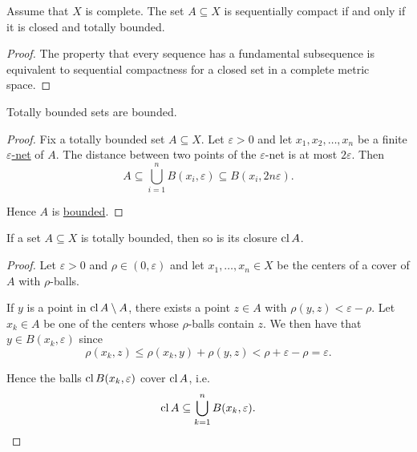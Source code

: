\begin{corollary}\label{thm:metric_space_compact_iff_closed_totally_bounded}
  Assume that \( X \) is complete. The set \( A \subseteq X \) is sequentially compact if and only if it is closed and totally bounded.
\end{corollary}
\begin{proof}
  The property that every sequence has a fundamental subsequence is equivalent to sequential compactness for a closed set in a complete metric space.
\end{proof}

\begin{proposition}\label{thm:totally_bounded_sets_are_bounded}
  Totally bounded sets are bounded.
\end{proposition}
\begin{proof}
  Fix a totally bounded set \( A \subseteq X \). Let \( \varepsilon > 0 \) and let \( x_1, x_2, \ldots, x_n \) be a finite \hyperref[def:totally_bounded_set/epsilon_net]{\( \varepsilon \)-net} of \( A \). The distance between two points of the \( \varepsilon \)-net is at most \( 2\varepsilon \). Then
  \begin{equation*}
    A \subseteq \bigcup_{i=1}^n B(x_i, \varepsilon) \subseteq B(x_i, 2 n \varepsilon).
  \end{equation*}

  Hence \( A \) is \hyperref[def:metric_space/bounded_set]{bounded}.
\end{proof}

\begin{proposition}\label{thm:closure_of_totally_bounded_is_totally_bounded}
  If a set \( A \subseteq X \) is totally bounded, then so is its closure \( \operatorname{cl} A \).
\end{proposition}
\begin{proof}
  Let \( \varepsilon > 0 \) and \( \rho \in (0, \varepsilon) \) and let \( x_1, \ldots, x_n \in X \) be the centers of a cover of \( A \) with \( \rho \)-balls.

  If \( y \) is a point in \( \operatorname{cl} A \setminus A \), there exists a point \( z \in A \) with \( \rho(y, z) < \varepsilon - \rho \). Let \( x_k \in A \) be one of the centers whose \( \rho \)-balls contain \( z \). We then have that \( y \in B(x_k, \varepsilon) \) since
  \begin{equation*}
    \rho(x_k, z) \leq \rho(x_k, y) + \rho(y, z) < \rho + \varepsilon - \rho = \varepsilon.
  \end{equation*}

  Hence the balls \( \operatorname{cl} B(x_k, \varepsilon) \) cover \( \operatorname{cl} A \), i.e.
  \begin{equation*}
    \operatorname{cl} A \subseteq \bigcup_{k=1}^n B(x_k, \varepsilon).
  \end{equation*}
\end{proof}

